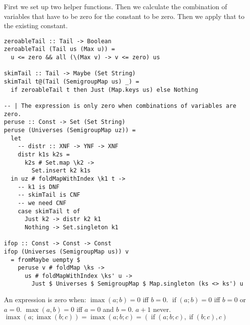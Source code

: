 \documentclass[11pt, twoside, reqno]{book}
\DeclareMathOperator{\imax}{imax}
\DeclareMathOperator{\ifop}{if}
\begin{document}
First we set up two helper functions.
Then we calculate the combination of variables that have to be zero for the constant to be zero.
Then we apply that to the existing constant.

\begin{verbatim}
zeroableTail :: Tail -> Boolean
zeroableTail (Tail us (Max u)) =
  u <= zero && all (\(Max v) -> v <= zero) us

skimTail :: Tail -> Maybe (Set String)
skimTail t@(Tail (SemigroupMap us) _) =
  if zeroableTail t then Just (Map.keys us) else Nothing

-- | The expression is only zero when combinations of variables are zero.
peruse :: Const -> Set (Set String)
peruse (Universes (SemigroupMap uz)) =
  let
    -- distr :: XNF -> YNF -> XNF
    distr k1s k2s =
      k2s # Set.map \k2 ->
        Set.insert k2 k1s
  in uz # foldMapWithIndex \k1 t ->
    -- k1 is DNF
    -- skimTail is CNF
    -- we need CNF
    case skimTail t of
      Just k2 -> distr k2 k1
      Nothing -> Set.singleton k1

ifop :: Const -> Const -> Const
ifop (Universes (SemigroupMap us)) v
  = fromMaybe uempty $
    peruse v # foldMap \ks ->
      us # foldMapWithIndex \ks' u ->
        Just $ Universes $ SemigroupMap $ Map.singleton (ks <> ks') u
\end{verbatim}

An expression is zero when:
\(\imax(a; b) = 0\) iff \(b = 0\).
\(\ifop(a; b) = 0\) iff \(b = 0\) or \(a = 0\).
\(\max(a, b) = 0\) iff \(a = 0\) and \(b = 0\).
\(a+1\) never.
\(\imax(a; \imax(b; c)) = \imax(a; b; c) = (\ifop(a; b; c), \ifop(b; c), c)\)



%
%
\end{document}
